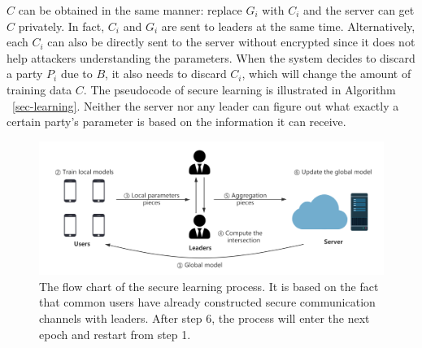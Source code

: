 $C$ can be obtained in the same manner: replace $G_i$ with $C_i$ and the server can get $C$ privately. In fact, $C_i$ and $G_i$ are sent to leaders at the same time. Alternatively, each $C_i$ can also be directly sent to the server without encrypted since it does not help attackers understanding the parameters. When the system decides to discard a party $P_i$ due to $B$, it also needs to discard $C_i$, which will change the amount of training data $C$. The pseudocode of secure learning is illustrated in Algorithm ~\ref{sec-learning}. Neither the server nor any leader can figure out what exactly a certain party's parameter is based on the information it can receive. 

\begin{figure}[!ht]
    \centering
    \includegraphics[width=2\columnwidth]{img/alg.png}
    \caption{The flow chart of the secure learning process. It is based on the fact that common users have already constructed secure communication channels with leaders. After step 6, the process will enter the next epoch and restart from step 1.}
    \label{fig-alg}
\end{figure}

